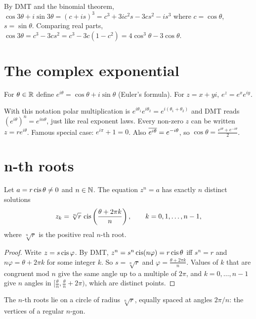 \begin{example}
By DMT and the binomial theorem, $\cos3\theta + i\sin 3\theta = (c + is)^3 = c^3 + 3ic^2s - 3cs^2
- is^3$ where $c = \cos\theta$, $s = \sin\theta$. Comparing real parts,
$\cos3\theta = c^3 - 3cs^2 = c^3 - 3c(1 - c^2) = 4\cos^3\theta - 3\cos\theta$.
\end{example}

\section{The complex exponential}

\begin{definition}
For $\theta\in\mathbb{R}$ define $e^{i\theta} = \cos\theta + i\sin\theta$ (Euler's formula). For
$z = x + yi$, $e^{z} = e^x e^{iy}$.
\end{definition}

With this notation polar multiplication is $e^{i\theta_1}e^{i\theta_2} = e^{i(\theta_1+\theta_2)}$
and DMT reads $(e^{i\theta})^n = e^{in\theta}$, just like real exponent laws. Every non-zero
$z$ can be written $z = re^{i\theta}$. Famous special case: $e^{i\pi} + 1 = 0$. Also
$\overline{e^{i\theta}} = e^{-i\theta}$, so $\cos\theta = \frac{e^{i\theta} + e^{-i\theta}}2$.

\section{n-th roots}

\begin{theorem}
Let $a = r\operatorname{cis}\theta \neq 0$ and $n \in \mathbb{N}$. The equation $z^n = a$ has exactly $n$ distinct
solutions
\[ z_k = \sqrt[n]{r}\,\operatorname{cis}\left(\frac{\theta + 2\pi k}{n}\right), \qquad k = 0,1,\dots,n-1, \]
where $\sqrt[n] r$ is the positive real $n$-th root.
\end{theorem}
\begin{proof}
Write $z = s\operatorname{cis}\varphi$. By DMT, $z^n = s^n\operatorname{cis}(n\varphi) = r\operatorname{cis}\theta$ iff $s^n = r$ and
$n\varphi = \theta + 2\pi k$ for some integer $k$. So $s = \sqrt[n]r$ and
$\varphi = \frac{\theta + 2\pi k}{n}$. Values of $k$ that are congruent mod $n$ give the same
angle up to a multiple of $2\pi$, and $k = 0,\dots,n-1$ give $n$ angles in $[\frac\theta n,
\frac\theta n + 2\pi)$, which are distinct points.
\end{proof}

The $n$-th roots lie on a circle of radius $\sqrt[n]r$, equally spaced at angles $2\pi/n$: the
vertices of a regular $n$-gon.

